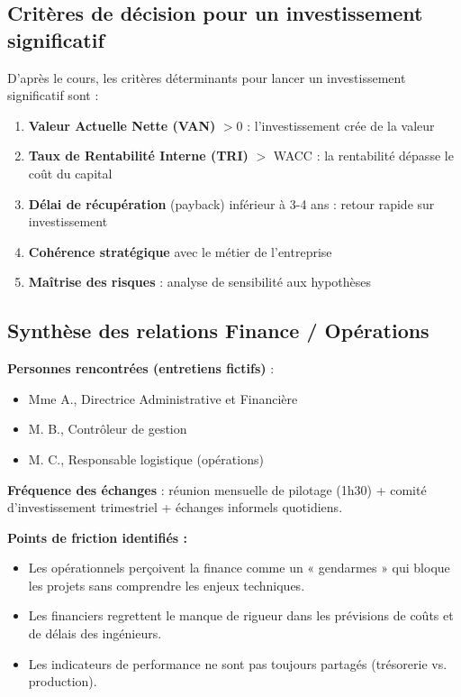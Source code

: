 \documentclass{rapportECL}
\begin{document}
\subsection{Critères de décision pour un investissement significatif}

D'après le cours, les critères déterminants pour lancer un investissement significatif sont :

\begin{enumerate}
    \item \textbf{Valeur Actuelle Nette (VAN)} $> 0$ : l'investissement crée de la valeur
    \item \textbf{Taux de Rentabilité Interne (TRI)} $>$ WACC : la rentabilité dépasse le coût du capital
    \item \textbf{Délai de récupération} (payback) inférieur à 3-4 ans : retour rapide sur investissement
    \item \textbf{Cohérence stratégique} avec le métier de l'entreprise
    \item \textbf{Maîtrise des risques} : analyse de sensibilité aux hypothèses
\end{enumerate}

\subsection{Synthèse des relations Finance / Opérations}

\textbf{Personnes rencontrées (entretiens fictifs)} :
\begin{itemize}
    \item Mme A., Directrice Administrative et Financière
    \item M. B., Contrôleur de gestion
    \item M. C., Responsable logistique (opérations)
\end{itemize}

\textbf{Fréquence des échanges} : réunion mensuelle de pilotage (1h30) + comité d'investissement trimestriel + échanges informels quotidiens.

\textbf{Points de friction identifiés :}
\begin{itemize}
    \item Les opérationnels perçoivent la finance comme un « gendarmes » qui bloque les projets sans comprendre les enjeux techniques.
    \item Les financiers regrettent le manque de rigueur dans les prévisions de coûts et de délais des ingénieurs.
    \item Les indicateurs de performance ne sont pas toujours partagés (trésorerie vs. production).
\end{itemize}
\end{document}
